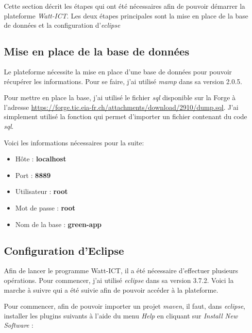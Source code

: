 Cette section décrit les étapes qui ont été nécessaires afin de pouvoir démarrer la plateforme \emph{Watt-ICT}. Les deux étapes principales sont la mise en place de la base de données et la configuration d'\emph{\gls{eclipse}}
\subsection{Mise en place de la base de données} %
\label{sub:mise_en_place_de_la_base_de_donn_es}
Le plateforme nécessite la mise en place d'une base de données pour pouvoir récupérer les informations. Pour se faire, j'ai utilisé \emph{\gls{mamp}} dans sa version 2.0.5.

\medskip

Pour mettre en place la base, j'ai utilisé le fichier \emph{\gls{sql}} disponible sur la Forge à l'adresse \url{https://forge.tic.eia-fr.ch/attachments/download/2910/dump.sql}. J'ai simplement utilisé la fonction qui permet d'importer un fichier contenant du code \emph{\gls{sql}}.

\medskip

Voici les informations nécessaires pour la suite:

\medskip

\begin{itemize}
 	\item Hôte : {\bf localhost}
 	\item Port : {\bf 8889}
 	\item Utilisateur : {\bf root}
 	\item Mot de passe : {\bf root}
 	\item Nom de la base : {\bf green-app}
 \end{itemize} 

\subsection{Configuration d'Eclipse} %
\label{sub:eclipse}

Afin de lancer le programme Watt-ICT, il a été nécessaire d'effectuer plusieurs opérations. Pour commencer, j'ai utilisé \emph{\gls{eclipse}} dans sa version 3.7.2. Voici la marche à suivre qui a été suivie afin de pouvoir accéder à la plateforme.

\medskip

Pour commencer, afin de pouvoir importer un projet \emph{\gls{maven}}, il faut,  dans \emph{\gls{eclipse}}, installer les plugins suivants à l'aide du menu \emph{Help} en cliquant sur \emph{Install New Software} :

